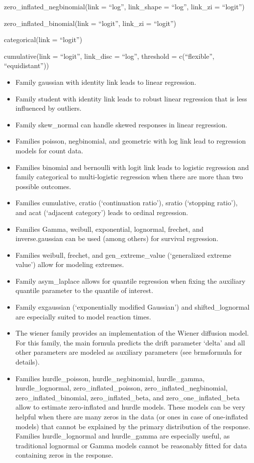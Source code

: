 \documentclass[]{book}
\begin{document}
zero\_inflated\_negbinomial(link = ``log'', link\_shape = ``log'',
link\_zi = ``logit'')

zero\_inflated\_binomial(link = ``logit'', link\_zi = ``logit'')

categorical(link = ``logit'')

cumulative(link = ``logit'', link\_disc = ``log'',
threshold = c(``flexible'', ``equidistant''))

\begin{itemize}
\item
  Family gaussian with identity link leads to linear regression.
\item
  Family student with identity link leads to robust linear regression that is less influenced by outliers.
\item
  Family skew\_normal can handle skewed responses in linear regression.
\item
  Families poisson, negbinomial, and geometric with log link lead to regression models for count data.
\item
  Families binomial and bernoulli with logit link leads to logistic regression and family categorical to multi-logistic regression when there are more than two possible outcomes.
\item
  Families cumulative, cratio (`continuation ratio'), sratio (`stopping ratio'), and acat (`adjacent category') leads to ordinal regression.
\item
  Families Gamma, weibull, exponential, lognormal, frechet, and inverse.gaussian can be used (among others) for survival regression.
\item
  Families weibull, frechet, and gen\_extreme\_value (`generalized extreme value') allow for modeling extremes.
\item
  Family asym\_laplace allows for quantile regression when fixing the auxiliary quantile parameter to the quantile of interest.
\item
  Family exgaussian (`exponentially modified Gaussian') and shifted\_lognormal are especially suited to model reaction times.
\item
  The wiener family provides an implementation of the Wiener diffusion model. For this family, the main formula predicts the drift parameter `delta' and all other parameters are modeled as auxiliary parameters (see brmsformula for details).
\item
  Families hurdle\_poisson, hurdle\_negbinomial, hurdle\_gamma, hurdle\_lognormal, zero\_inflated\_poisson, zero\_inflated\_negbinomial, zero\_inflated\_binomial, zero\_inflated\_beta, and zero\_one\_inflated\_beta allow to estimate zero-inflated and hurdle models. These models can be very helpful when there are many zeros in the data (or ones in case of one-inflated models) that cannot be explained by the primary distribution of the response. Families hurdle\_lognormal and hurdle\_gamma are especially useful, as traditional lognormal or Gamma models cannot be reasonably fitted for data containing zeros in the response.
\end{itemize}
\end{document}
